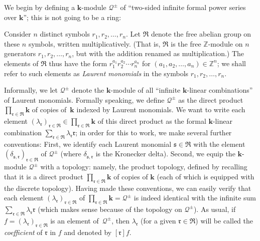We begin by defining a $\mathbf{k}$-module $\mathcal{Q}^{\pm}$ of ``two-sided infinite formal power series over $\mathbf{k}$''; this is not going to be a ring:

\begin{Definition} \label{def.Qbig}Consider $n$ distinct symbols $r_{1},r_{2},\ldots,r_{n}$. Let $\mathfrak{R}$ denote the free abelian group on these $n$ symbols, written multiplicatively. (That is, $\mathfrak{R}$ is the free $\mathbb{Z}$-module on $n$ generators $r_{1},r_{2},\ldots,r_{n}$, but with the addition renamed as multiplication.) The elements of $\mathfrak{R}$ thus have the form $r_{1}^{a_{1}}r_{2}^{a_{2}}\cdots r_{n}^{a_{n}}$ for $( a_{1},a_{2},\ldots,a_{n}) \in\mathbb{Z}^{n}$; we shall refer to such elements as \textit{Laurent monomials} in the symbols $r_{1},r_{2},\ldots,r_{n}$.

Informally, we let $\mathcal{Q}^{\pm}$ denote the $\mathbf{k}$-module of all ``infinite $\mathbf{k}$-linear combinations'' of Laurent monomials. Formally speaking, we define $\mathcal{Q}^{\pm}$ as the direct product $\prod_{\mathfrak{r}\in\mathfrak{R}}\mathbf{k}$ of copies of~$\mathbf{k}$ indexed by Laurent monomials. We want to write each element $ ( \lambda_{\mathfrak{r}}) _{\mathfrak{r}\in\mathfrak{R}}\in \prod_{\mathfrak{r}\in\mathfrak{R}}\mathbf{k}$ of this direct product as the formal $\mathbf{k}$-linear combination $\sum_{\mathfrak{r}\in\mathfrak{R}}\lambda_{\mathfrak{r}}\mathfrak{r}$; in order for this to work, we make
several further conventions: First, we identify each Laurent monomial $\mathfrak{s}\in\mathfrak{R}$ with the element $( \delta_{\mathfrak{s},\mathfrak{r}}) _{\mathfrak{r}\in\mathfrak{R}}$ of $\mathcal{Q}^{\pm}$ (where $\delta_{\mathfrak{s},\mathfrak{r}}$ is the Kronecker delta). Second, we equip the $\mathbf{k}$-module $\mathcal{Q}^{\pm}$ with a topology: namely, the product topology, defined by recalling that it is a direct product
$\prod_{\mathfrak{r}\in\mathfrak{R}}\mathbf{k}$ of copies of $\mathbf{k}$ (each of which is equipped with the discrete topology). Having made these conventions, we can easily verify that each element $( \lambda_{\mathfrak{r}}) _{\mathfrak{r}\in\mathfrak{R}}$ of $\prod_{\mathfrak{r}\in\mathfrak{R}}\mathbf{k}=\mathcal{Q}^{\pm}$ is indeed identical with the infinite sum $\sum_{\mathfrak{r}\in\mathfrak{R}}\lambda_{\mathfrak{r}}\mathfrak{r}$ (which makes sense because of the topology on $\mathcal{Q}^{\pm}$). As usual, if $f= ( \lambda_{\mathfrak{r}} ) _{\mathfrak{r}\in\mathfrak{R}}$ is an element of~$\mathcal{Q}^{\pm}$, then $\lambda_{\mathfrak{r}}$ (for a given $\mathfrak{r}\in\mathfrak{R}$) will be called the \textit{coefficient} of $\mathfrak{r}$ in $f$ and denoted by $ [ \mathfrak{r} ] f$.
\end{Definition}

